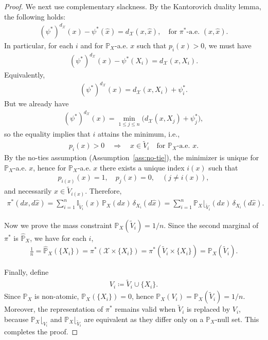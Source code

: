 \documentclass[10pt,a4paper]{amsart}
\begin{document}
\begin{proof}
	We next use complementary slackness. By the Kantorovich duality lemma, the following holds:	
	\begin{align*}		
		(\psi^*)^{d_{\mathcal{X}}}(x) - \psi^*(\hat{x}) = d_{\mathcal{X}}(x,\hat{x}) , \quad\text{for }\pi^*\text{-a.e. }(x,\hat{x}).		
	\end{align*}	
	In particular, for each $i$ and for $\mathbb{P}_X$-a.e. $x$ such that $p_i(x)>0$, we must have	
	\begin{align*}		
		(\psi^*)^{d_{\mathcal{X}}}(x) - \psi^*(X_i) = d_{\mathcal{X}}(x,X_i).		
	\end{align*}	
	Equivalently,	
	\begin{align*}	
		(\psi^*)^{d_{\mathcal{X}}}(x) = d_{\mathcal{X}}(x,X_i) + \psi_i^*.		
	\end{align*}	
	But we already have	
	\begin{align*}		
		(\psi^*)^{d_{\mathcal{X}}}(x)=\min_{1 \leq j \leq n}\bigl(d_{\mathcal{X}}(x,X_j)+\psi_j^*\bigr),		
	\end{align*}	
	so the equality implies that $i$ attains the minimum, i.e.,	
	\begin{align*}		
		p_i(x)>0 \quad\Longrightarrow\quad x\in \tilde{V}_i \quad \text{for }\mathbb{P}_X\text{-a.e. }x.		
	\end{align*}	
	By the no-ties assumption (Assumption~\ref{ass:no-tie}), the minimizer is unique for $\mathbb{P}_X$-a.e. $x$, hence for $\mathbb{P}_X$-a.e. $x$ there exists a unique index $i(x)$ such that	
	\begin{align*}		
		p_{i(x)}(x)=1,\quad p_j(x)=0 , \quad (j\neq i(x)),		
	\end{align*}	
	and necessarily $x\in \tilde{V}_{i(x)}$. Therefore,	
	\begin{align*}		
		\pi^*(dx,d\hat{x}) = \sum_{i=1}^n \mathbb{I}_{\tilde{V}_i}(x)\,\mathbb{P}_X(dx)\,\delta_{X_i}(d\hat{x}) = \sum_{i=1}^n \mathbb{P}_X\lfloor_ {\tilde{V}_i}(dx)\,\delta_{X_i}(d\hat{x}) .		
	\end{align*}
	
	Now we prove the mass constraint $\mathbb{P}_X(\tilde{V}_i)=1/n$. Since the second marginal of $\pi^*$ is $\hat{\mathbb{P}}_X$, we have for each $i$,	
	\begin{align*}		
		\frac{1}{n} = \hat{\mathbb{P}}_X(\{X_i\}) = \pi^*(\mathcal{X}\times\{X_i\}) = \pi^*(\tilde{V}_i\times\{X_i\}) = \mathbb{P}_X(\tilde{V}_i) .		
	\end{align*}
	
	Finally, define	
	\begin{align*}		
		V_i \coloneqq \tilde{V}_i \cup \{X_i\}.		
	\end{align*}	
	Since $\mathbb{P}_X$ is non-atomic, $\mathbb{P}_X(\{X_i\})=0$, hence $\mathbb{P}_X(V_i)=\mathbb{P}_X(\tilde{V}_i)=1/n$. Moreover, the representation of $\pi^*$ remains valid when $\tilde{V}_i$ is replaced by $V_i$, because $\mathbb{P}_X \lfloor_{V_i}$ and $\mathbb{P}_X \lfloor_{\tilde{V}_i}$ are equivalent as they differ only on a $\mathbb{P}_X$-null set. This completes the proof.
\end{proof}
\end{document}
